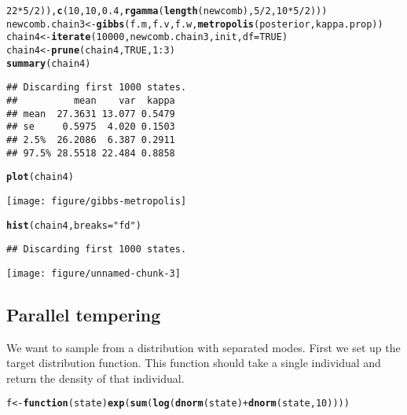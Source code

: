 \documentclass{article}\usepackage[]{graphicx}\usepackage[]{color}
\makeatletter
\def\maxwidth{ %
  \ifdim\Gin@nat@width>\linewidth
    \linewidth
  \else
    \Gin@nat@width
  \fi
}
\newcommand{\hlnum}[1]{\textcolor[rgb]{0.686,0.059,0.569}{#1}}%
\newcommand{\hlstr}[1]{\textcolor[rgb]{0.192,0.494,0.8}{#1}}%
\newcommand{\hlopt}[1]{\textcolor[rgb]{0,0,0}{#1}}%
\newcommand{\hlstd}[1]{\textcolor[rgb]{0.345,0.345,0.345}{#1}}%
\newcommand{\hlkwa}[1]{\textcolor[rgb]{0.161,0.373,0.58}{\textbf{#1}}}%
\newcommand{\hlkwb}[1]{\textcolor[rgb]{0.69,0.353,0.396}{#1}}%
\newcommand{\hlkwc}[1]{\textcolor[rgb]{0.333,0.667,0.333}{#1}}%
\newcommand{\hlkwd}[1]{\textcolor[rgb]{0.737,0.353,0.396}{\textbf{#1}}}%
\newenvironment{kframe}{%
 \def\at@end@of@kframe{}%
 \ifinner\ifhmode%
  \def\at@end@of@kframe{\end{minipage}}%
  \begin{minipage}{\columnwidth}%
 \fi\fi%
 \def\FrameCommand##1{\hskip\@totalleftmargin \hskip-\fboxsep
 \colorbox{shadecolor}{##1}\hskip-\fboxsep
     \hskip-\linewidth \hskip-\@totalleftmargin \hskip\columnwidth}%
 \MakeFramed {\advance\hsize-\width
   \@totalleftmargin\z@ \linewidth\hsize
   \@setminipage}}%
 {\par\unskip\endMakeFramed%
 \at@end@of@kframe}
\newenvironment{knitrout}{}{} %
\makeatother
\begin{document}
\begin{knitrout}
\begin{kframe}
\begin{alltt}
    \hlnum{22} \hlopt{*} \hlnum{5}\hlopt{/}\hlnum{2}\hlstd{)),} \hlkwd{c}\hlstd{(}\hlnum{10}\hlstd{,} \hlnum{10}\hlstd{,} \hlnum{0.4}\hlstd{,} \hlkwd{rgamma}\hlstd{(}\hlkwd{length}\hlstd{(newcomb),} \hlnum{5}\hlopt{/}\hlnum{2}\hlstd{,} \hlnum{10} \hlopt{*} \hlnum{5}\hlopt{/}\hlnum{2}\hlstd{)))}
\hlstd{newcomb.chain3} \hlkwb{<-} \hlkwd{gibbs}\hlstd{(f.m, f.v, f.w,} \hlkwd{metropolis}\hlstd{(posterior, kappa.prop))}
\hlstd{chain4} \hlkwb{<-} \hlkwd{iterate}\hlstd{(}\hlnum{10000}\hlstd{, newcomb.chain3, init,} \hlkwc{df} \hlstd{=} \hlnum{TRUE}\hlstd{)}
\hlstd{chain4} \hlkwb{<-} \hlkwd{prune}\hlstd{(chain4,} \hlnum{TRUE}\hlstd{,} \hlnum{1}\hlopt{:}\hlnum{3}\hlstd{)}
\hlkwd{summary}\hlstd{(chain4)}
\end{alltt}
\begin{verbatim}
## Discarding first 1000 states.
##          mean    var  kappa
## mean  27.3631 13.077 0.5479
## se     0.5975  4.020 0.1503
## 2.5%  26.2086  6.387 0.2911
## 97.5% 28.5518 22.484 0.8858
\end{verbatim}
\begin{alltt}
\hlkwd{plot}\hlstd{(chain4)}
\end{alltt}
\end{kframe}
\texttt{[image: figure/gibbs-metropolis]} 

\end{knitrout}

\begin{knitrout}
\color{fgcolor}\begin{kframe}
\begin{alltt}
\hlkwd{hist}\hlstd{(chain4,} \hlkwc{breaks} \hlstd{=} \hlstr{"fd"}\hlstd{)}
\end{alltt}
\begin{verbatim}
## Discarding first 1000 states.
\end{verbatim}
\end{kframe}
\texttt{[image: figure/unnamed-chunk-3]} 

\end{knitrout}


\subsection{Parallel tempering}
We want to sample from a distribution with separated modes.  First we
set up the target distribution function. This function should take a
single individual and return the density of that individual.
\begin{knitrout}
\color{fgcolor}\begin{kframe}
\begin{alltt}
\hlstd{f} \hlkwb{<-} \hlkwa{function}\hlstd{(}\hlkwc{state}\hlstd{)} \hlkwd{exp}\hlstd{(}\hlkwd{sum}\hlstd{(}\hlkwd{log}\hlstd{(}\hlkwd{dnorm}\hlstd{(state)} \hlopt{+} \hlkwd{dnorm}\hlstd{(state,} \hlnum{10}\hlstd{))))}
\end{alltt}
\end{kframe}
\end{knitrout}
\end{document}
